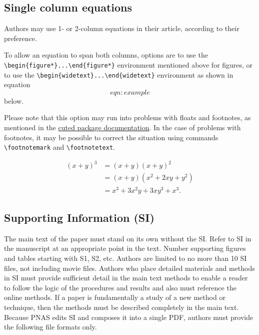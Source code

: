 \documentclass[9pt,twocolumn,twoside,]{pnas-new}
\begin{document}
\subsection*{Single column equations}\label{single-column-equations}

Authors may use 1- or 2-column equations in their article, according to
their preference.

To allow an equation to span both columns, options are to use the
\texttt{\textbackslash{}begin\{figure*\}...\textbackslash{}end\{figure*\}}
environment mentioned above for figures, or to use the
\texttt{\textbackslash{}begin\{widetext\}...\textbackslash{}end\{widetext\}}
environment as shown in equation \[eqn:example\] below.

Please note that this option may run into problems with floats and
footnotes, as mentioned in the \href{http://texdoc.net/pkg/cuted}{cuted
package documentation}. In the case of problems with footnotes, it may
be possible to correct the situation using commands
\texttt{\textbackslash{}footnotemark} and
\texttt{\textbackslash{}footnotetext}.

\[\begin{aligned}
(x+y)^3&=(x+y)(x+y)^2\\
       &=(x+y)(x^2+2xy+y^2) \label{eqn:example} \\
       &=x^3+3x^2y+3xy^3+x^3. 
\end{aligned}\]

\subsection*{Supporting Information
(SI)}\label{supporting-information-si}

The main text of the paper must stand on its own without the SI. Refer
to SI in the manuscript at an appropriate point in the text. Number
supporting figures and tables starting with S1, S2, etc. Authors are
limited to no more than 10 SI files, not including movie files. Authors
who place detailed materials and methods in SI must provide sufficient
detail in the main text methods to enable a reader to follow the logic
of the procedures and results and also must reference the online
methods. If a paper is fundamentally a study of a new method or
technique, then the methods must be described completely in the main
text. Because PNAS edits SI and composes it into a single PDF, authors
must provide the following file formats only.
\end{document}
